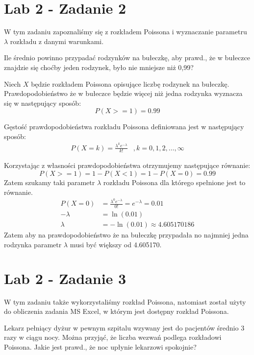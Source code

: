 \documentclass{article}
\begin{document}
\section{Lab 2 - Zadanie 2}
W tym zadaniu zapoznaliśmy się z rozkładem Poissona i wyznaczanie parametru $\lambda$ rozkładu z danymi warunkami. \\ \par

Ile średnio powinno przypadać rodzynków na bułeczkę, aby prawd., że w bułeczce znajdzie się choćby jeden rodzynek, było nie mniejsze niż 0,99? \\ \par

Niech $X$ będzie rozkładem Poissona opisujące liczbę rodzynek na bułeczkę. Prawdopodobieństwo że w bułeczce będzie więcej niż jedna rodzynka wyznacza się w następujący sposób:
\[ P(X >= 1) = 0.99 \]

Gęstość prawdopodobieństwa rozkładu Poissona definiowana jest w następujący sposób:
\[ \begin{array}{cc} P(X=k) = \frac{\lambda^ke^{-\lambda}}{k!} &, k =0,1,2,\dots,\infty \end{array} \]

Korzystając z własności prawdopodobieństwa otrzymujemy następujące równanie:
\[  P(X >= 1) = 1 - P(X<1) = 1 - P(X=0) = 0.99 \]
Zatem szukamy taki parametr $\lambda$ rozkładu Poissona dla którego spełnione jest to równanie.
\begin{align*}
P(X=0) & = \frac{\lambda^0e^{-\lambda}}{0!} = e^{-\lambda} = 0.01 \\
-\lambda & = \ln(0.01) \\
\lambda & = -\ln(0.01) \approx 4.605170186
\end{align*}
Zatem aby na prawdopodobieństwo że na bułeczkę przypadała no najmniej jedna rodzynka parametr $\lambda$ musi być większy od 4.605170.

\section{Lab 2 - Zadanie 3}
W tym zadaniu także wykorzystaliśmy rozkład Poissona, natomiast został użyty do obliczenia zadania MS Excel, w którym jest dostępny rozkład Poissona. \\ \par

Lekarz pełniący dyżur w pewnym szpitalu wzywany jest do pacjentów średnio 3 razy w ciągu nocy. Można przyjąć, że liczba wezwań podlega rozkładowi Poissona. Jakie jest prawd., że noc upłynie lekarzowi spokojnie? \\ \par
\end{document}
